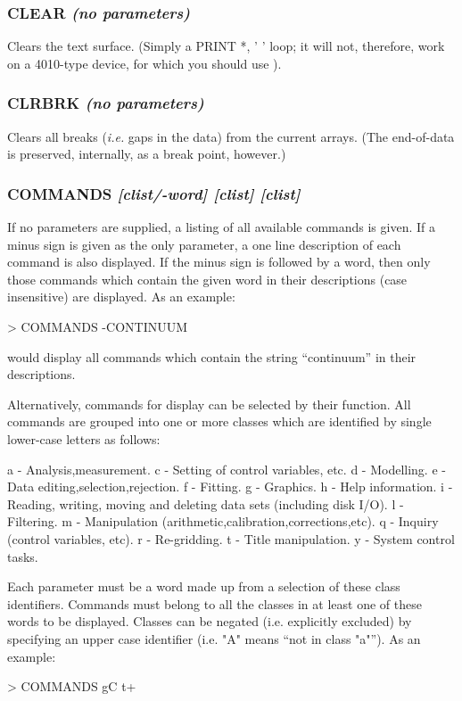 \documentclass[twoside,11pt,noabs,nolof]{starlink}
\providecommand{\dipcom}[3]{\subsubsection*{\label{COM:#1}\textbf{#1} \emph{#2}}}
\begin{document}
\dipcom{CLEAR}{(no parameters)}{Clears the command window}
Clears the text surface. (Simply a PRINT *, ' ' loop; it will not,
therefore, work on a 4010-type device, for which you should use
).

\dipcom{CLRBRK}{(no parameters)}{Removes breaks from an array}
Clears all breaks (\emph{i.e.} gaps in the data) from the current
arrays. (The end-of-data is preserved, internally, as a break point,
however.)

\dipcom{COMMANDS}{[clist/-word] [clist] [clist]}{Display classified lists of commands with brief descriptions}
If no parameters are supplied, a listing of all available commands is
given. If a minus sign is given as the only parameter, a one line
description of each command is also displayed. If the minus sign is
followed by a word, then only those commands which contain the given
word in their descriptions (case insensitive) are displayed. As an example:

\begin{terminalv}
> COMMANDS -CONTINUUM
\end{terminalv}

would display all commands which contain the string ``continuum'' in their
descriptions.

Alternatively, commands for display can be selected by their function.
All commands are grouped into one or more classes which are identified
by single lower-case letters as follows:

\begin{terminalv}
a - Analysis,measurement.
c - Setting of control variables, etc.
d - Modelling.
e - Data editing,selection,rejection.
f - Fitting.
g - Graphics.
h - Help information.
i - Reading, writing, moving and deleting data sets (including
    disk I/O).
l - Filtering.
m - Manipulation (arithmetic,calibration,corrections,etc).
q - Inquiry (control variables, etc).
r - Re-gridding.
t - Title manipulation.
y - System control tasks.
\end{terminalv}

Each parameter must be a word made up from a selection of these class
identifiers. Commands must belong to all the classes in at least one of
these words to be displayed. Classes can be negated (i.e. explicitly
excluded) by specifying an upper case identifier (i.e. "A" means ``not
in class "a"''). As an example:

\begin{terminalv}
> COMMANDS gC t+
\end{terminalv}
\end{document}
